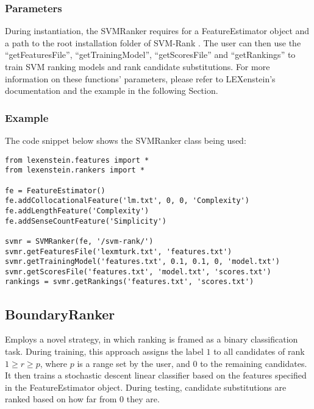 \subsubsection{Parameters}

During instantiation, the SVMRanker requires for a FeatureEstimator object and a path to the root installation folder of SVM-Rank \cite{svmrank}. The user can then use the ``getFeaturesFile'', ``getTrainingModel'', ``getScoresFile'' and ``getRankings'' to train SVM ranking models and rank candidate substitutions. For more information on these functions' parameters, please refer to LEXenstein's documentation and the example in the following Section.

\subsubsection{Example}

The code snippet below shows the SVMRanker class being used:

\begin{lstlisting}
from lexenstein.features import *
from lexenstein.rankers import *

fe = FeatureEstimator()
fe.addCollocationalFeature('lm.txt', 0, 0, 'Complexity')
fe.addLengthFeature('Complexity')
fe.addSenseCountFeature('Simplicity')

svmr = SVMRanker(fe, '/svm-rank/')
svmr.getFeaturesFile('lexmturk.txt', 'features.txt')
svmr.getTrainingModel('features.txt', 0.1, 0.1, 0, 'model.txt')
svmr.getScoresFile('features.txt', 'model.txt', 'scores.txt')
rankings = svmr.getRankings('features.txt', 'scores.txt')
\end{lstlisting}



















\subsection{BoundaryRanker}

Employs a novel strategy, in which ranking is framed as a binary classification task. During training, this approach assigns the label $1$ to all candidates of rank $1\geq r \geq p$, where $p$ is a range set by the user, and $0$ to the remaining candidates. It then trains a stochastic descent linear classifier based on the features specified in the FeatureEstimator object. During testing, candidate substitutions are ranked based on how far from $0$ they are.

